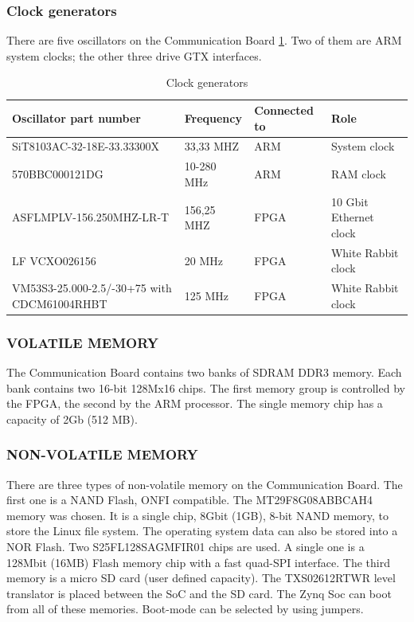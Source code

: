 \subsubsection{Clock generators}

There are five oscillators on the Communication Board \ref{tab:clocks}. Two of them are ARM system clocks; the other three drive GTX interfaces.

\begin{table}[]
\centering
\caption{Clock generators}
\label{tab:clocks}
\begin{tabular}{|l|l|l|l|}
\hline
Oscillator part number & Frequency & Connected to & Role \\ \hline
SiT8103AC-32-18E-33.33300X & 33,33 MHZ & ARM & System clock \\ \hline
570BBC000121DG & 10-280 MHz & ARM & RAM clock \\ \hline
ASFLMPLV-156.250MHZ-LR-T & 156,25 MHZ & FPGA & 10 Gbit Ethernet clock \\ \hline
LF VCXO026156 & 20 MHz & FPGA & White Rabbit clock \\ \hline
VM53S3-25.000-2.5/-30+75 with CDCM61004RHBT & 125 MHz & FPGA & White Rabbit clock \\ \hline
\end{tabular}
\end{table}

\subsubsection{VOLATILE MEMORY}
The Communication Board contains two banks of SDRAM DDR3 memory. Each bank contains two 16-bit 128Mx16 chips. The first memory group is controlled by the FPGA, the second by the ARM processor. The single memory chip has a capacity of 2Gb (512 MB). 

\subsubsection{NON-VOLATILE MEMORY}
There are three types of non-volatile memory on the Communication Board. The first one is a NAND Flash, ONFI compatible. The MT29F8G08ABBCAH4 memory was chosen. It is a single chip, 8Gbit (1GB), 8-bit NAND memory, to store the Linux file system.
The operating system data can also be stored into a NOR Flash. Two S25FL128SAGMFIR01 chips are used. A single one is a 128Mbit (16MB) Flash memory chip with a fast quad-SPI interface. 
The third memory is a micro SD card (user defined capacity). The TXS02612RTWR level translator is placed between the SoC and the SD card.
The Zynq Soc can boot from all of these memories. Boot-mode can be selected by using jumpers.

